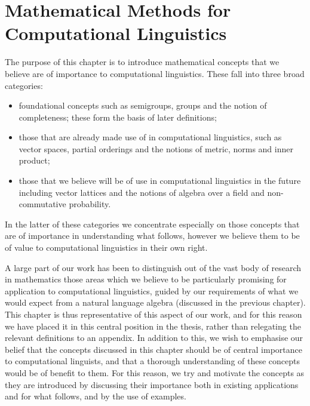 \documentclass[12pt]{report}
\begin{document}
 

 \chapter{Mathematical Methods for Computational Linguistics}
 
The purpose of this chapter is to introduce mathematical concepts that we believe are of importance to computational linguistics. These fall into three broad categories:

\begin{itemize}
\item foundational concepts such as semigroups, groups and the notion of completeness; these form the basis of later definitions;
\item those that are already made use of in computational linguistics, such as vector spaces, partial orderings and the notions of metric, norms and inner product;
\item those that we believe will be of use in computational linguistics in the future including vector lattices and the notions of algebra over a field and non-commutative probability.
\end{itemize}
In the latter of these categories we concentrate especially on those concepts that are of importance in understanding what follows, however we believe them to be of value to computational linguistics in their own right.

A large part of our work has been to distinguish out of the vast body of research in mathematics those areas which we believe to be particularly promising for application to computational linguistics, guided by our requirements of what we would expect from a natural language algebra (discussed in the previous chapter). This chapter is thus representative of this aspect of our work, and for this reason we have placed it in this central position in the thesis, rather than relegating the relevant definitions to an appendix. In addition to this, we wish to emphasise our belief that the concepts discussed in this chapter should be of central importance to computational linguists, and that a thorough understanding of these concepts would be of benefit to them. For this reason, we try and motivate the concepts as they are introduced by discussing their importance both in existing applications and for what follows, and by the use of examples.
\end{document}
